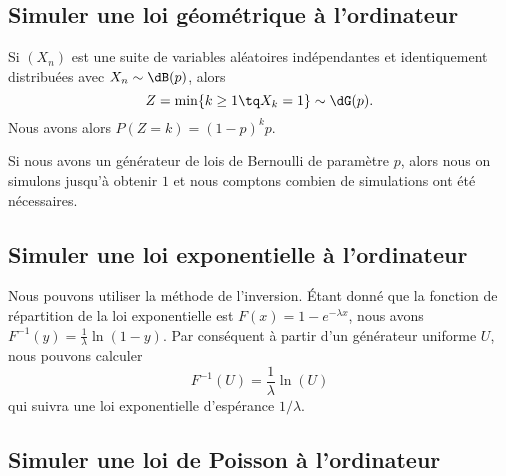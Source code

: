 \subsection{Simuler une loi géométrique à l'ordinateur}

Si \( (X_n)\) est une suite de variables aléatoires indépendantes et identiquement distribuées avec \( X_n\sim \dB(p)\), alors
\begin{equation}
	Z=\min\{ k\geq 1\tq X_k=1 \}\sim\dG(p).
\end{equation}
Nous avons alors \( P(Z=k)=(1-p)^kp\).

Si nous avons un générateur de lois de Bernoulli de paramètre \( p\), alors nous on simulons jusqu'à obtenir \( 1\) et nous comptons combien de simulations ont été nécessaires.

\subsection{Simuler une loi exponentielle à l'ordinateur}

Nous pouvons utiliser la méthode de l'inversion. Étant donné que la fonction de répartition de la loi exponentielle est \( F(x)=1- e^{-\lambda x}\), nous avons \( F^{-1}(y)=\frac{1}{ \lambda }\ln(1-y)\). Par conséquent à partir d'un générateur uniforme \( U\), nous pouvons calculer
\begin{equation}
	F^{-1}(U)=\frac{1}{ \lambda }\ln(U)
\end{equation}
qui suivra une loi exponentielle d'espérance \( 1/\lambda\).

\subsection{Simuler une loi de Poisson à l'ordinateur}

